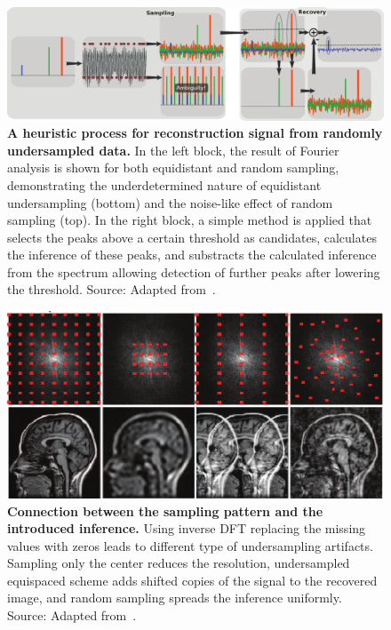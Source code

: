 \begin{figure}[tb]
    \centering
    \includegraphics[width=0.9\linewidth]{images/random_sampling.png}
    \caption{\textbf{A heuristic process for reconstruction signal from randomly undersampled data.} In the left block, the result of Fourier analysis is shown for both equidistant and random sampling, demonstrating the underdetermined nature of equidistant undersampling (bottom) and the noise-like effect of random sampling (top). In the right block, a simple method is applied that selects the peaks above a certain threshold as candidates, calculates the inference of these peaks, and substracts the calculated inference from the spectrum allowing detection of further peaks after lowering the threshold. Source: Adapted from~\cite{lustig_compressed_2008}.}
    \label{fig:random_sampling_1D}
\end{figure}

\begin{figure}[tb]
    \centering
    \includegraphics[width=0.8\linewidth]{images/random_sampling2.png}
    \caption{\textbf{Connection between the sampling pattern and the introduced inference.} Using inverse DFT replacing the missing values with zeros leads to different type of undersampling artifacts. Sampling only the center reduces the resolution, undersampled equispaced scheme adds shifted copies of the signal to the recovered image, and random sampling spreads the inference uniformly. Source: Adapted from~\cite{lustig_compressed_2008}.}
    \label{fig:random_sampling_images}
\end{figure}

